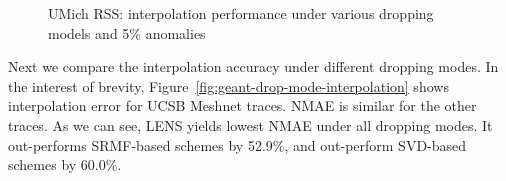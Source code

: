 {\begin{figure}[h!]
{  }
  \hspace{-0.1in}
  \vspace{-0.15in}
  \caption{UMich RSS: interpolation performance under various dropping
    models and 5\% anomalies}
  \vspace{-0.15in}
  \label{fig:umich-rss-drop-mode-detection}
\end{figure}
}

 Next we compare the interpolation
accuracy under different dropping
modes. In the interest of brevity,
Figure~\ref{fig:geant-drop-mode-interpolation} shows 
interpolation error for UCSB Meshnet traces. NMAE
is similar for the other traces. As we can see, LENS
yields lowest NMAE under all dropping modes. It out-performs
SRMF-based schemes by 52.9\%, and out-perform SVD-based schemes by
60.0\%. %


